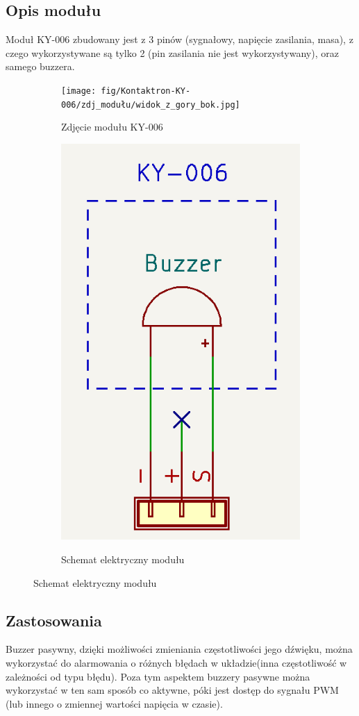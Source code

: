 \documentclass[11pt, a4paper]{article}
\begin{document}
\subsection{Opis modułu}
Moduł KY-006 zbudowany jest z 3 pinów (sygnałowy, napięcie zasilania, masa), z czego wykorzystywane są tylko 2 (pin zasilania nie jest wykorzystywany), oraz samego buzzera.
\begin{figure}[H]
\centering
\begin{subfigure}{.5\textwidth}
  \centering
  \texttt{[image: fig/Kontaktron-KY-006/zdj\_modułu/widok\_z\_gory\_bok.jpg]}
  \label{fig:sub1}
  \caption{Zdjęcie modułu KY-006}
\end{subfigure}%
\begin{subfigure}{.5\textwidth}
  \centering
  \includegraphics[width=.5\linewidth]{fig/Kontaktron-KY-006/zasada_dzialania/schemat_ukladu.PNG}
  \label{fig:sub2}
  \caption{Schemat elektryczny modułu}
\end{subfigure}
\label{fig:test}
\end{figure}

\subsection{Zastosowania}
Buzzer pasywny, dzięki możliwości zmieniania częstotliwości jego dźwięku, można wykorzystać do alarmowania o różnych błędach w układzie(inna częstotliwość w zależności od typu błędu). Poza tym aspektem buzzery pasywne można wykorzystać w ten sam sposób co aktywne, póki jest dostęp do sygnału PWM (lub innego o zmiennej wartości napięcia w czasie).
\end{document}
